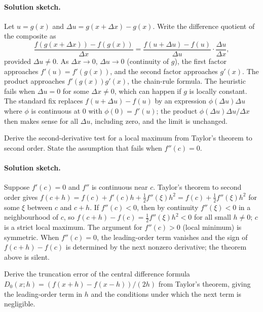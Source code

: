 \paragraph{Solution sketch.}
Let $u = g(x)$ and $\Delta u = g(x + \Delta x) - g(x)$. Write the
difference quotient of the composite as
\[
\frac{f(g(x + \Delta x)) - f(g(x))}{\Delta x} =
\frac{f(u + \Delta u) - f(u)}{\Delta u} \cdot
\frac{\Delta u}{\Delta x},
\]
provided $\Delta u \neq 0$. As $\Delta x \to 0$, $\Delta u \to 0$
(continuity of $g$), the first factor approaches $f'(u) = f'(g(x))$,
and the second factor approaches $g'(x)$. The product approaches
$f'(g(x)) g'(x)$, the chain-rule formula. The heuristic fails when
$\Delta u = 0$ for some $\Delta x \neq 0$, which can happen if $g$
is locally constant. The standard fix replaces $f(u + \Delta u) -
f(u)$ by an expression $\phi(\Delta u) \Delta u$ where $\phi$ is
continuous at $0$ with $\phi(0) = f'(u)$; the product
$\phi(\Delta u) \Delta u / \Delta x$ then makes sense for all
$\Delta u$, including zero, and the limit is unchanged.

\begin{exercise}
Derive the second-derivative test for a local maximum from
Taylor's theorem to second order. State the assumption that
fails when $f''(c) = 0$.
\end{exercise}

\paragraph{Solution sketch.}
Suppose $f'(c) = 0$ and $f''$ is continuous near $c$. Taylor's
theorem to second order gives
$f(c + h) = f(c) + f'(c) h + \tfrac{1}{2} f''(\xi) h^{2} =
f(c) + \tfrac{1}{2} f''(\xi) h^{2}$ for some $\xi$ between $c$
and $c + h$. If $f''(c) < 0$, then by continuity $f''(\xi) < 0$
in a neighbourhood of $c$, so $f(c + h) - f(c) =
\tfrac{1}{2} f''(\xi) h^{2} < 0$ for all small $h \neq 0$; $c$
is a strict local maximum. The argument for $f''(c) > 0$ (local
minimum) is symmetric. When $f''(c) = 0$, the leading-order term
vanishes and the sign of $f(c + h) - f(c)$ is determined by the
next nonzero derivative; the theorem above is silent.

\begin{exercise}
Derive the truncation error of the central difference formula
$D_{0}(x; h) = (f(x + h) - f(x - h))/(2 h)$ from Taylor's theorem,
giving the leading-order term in $h$ and the conditions under
which the next term is negligible.
\end{exercise}

